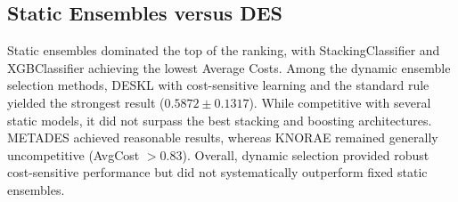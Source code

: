 \documentclass[conference]{IEEEtran}
\begin{document}
\subsection{Static Ensembles versus DES}
Static ensembles dominated the top of the ranking, with StackingClassifier and XGBClassifier achieving the lowest Average Costs. Among the dynamic ensemble selection methods, DESKL with cost-sensitive learning and the standard rule yielded the strongest result ($0.5872 \pm 0.1317$). While competitive with several static models, it did not surpass the best stacking and boosting architectures. METADES achieved reasonable results, whereas KNORAE remained generally uncompetitive (AvgCost $> 0.83$). Overall, dynamic selection provided robust cost-sensitive performance but did not systematically outperform fixed static ensembles.
\end{document}
